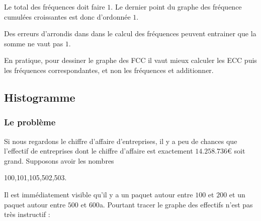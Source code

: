 \begin{center}

\end{center}

\begin{remark}
    Le total des fréquences doit faire \( 1\). Le dernier point du graphe des fréquence cumulées croissantes est donc d'ordonnée \( 1\).

    Des erreurs d'arrondis dans dans le calcul des fréquences peuvent entrainer que la somme ne vaut pas \( 1\).

    En pratique, pour dessiner le graphe des FCC il vaut mieux calculer les ECC puis les fréquences correspondantes, et non les fréquences et additionner.

\end{remark}

\subsection{Histogramme}

\subsubsection{Le problème}

Si nous regardons le chiffre d'affaire d'entreprises, il y a peu de chances que l'effectif de entreprises dont le chiffre d'affaire est exactement \( 14.258.736\)€ soit grand. Supposons avoir les nombres
\begin{center}
    100,101,105,502,503.
\end{center}
Il est immédiatement visible qu'il y a un paquet autour entre \( 100\) et \( 200\) et un paquet autour entre \( 500\) et \( 600\)a. Pourtant tracer le graphe des effectifs n'est pas très instructif :
\begin{center}
   
\end{center}

